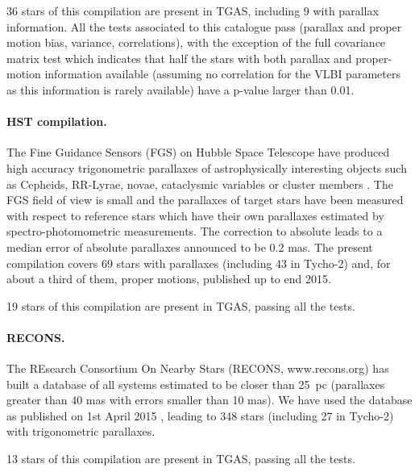 36 stars of this compilation are present in TGAS, including 9 with parallax information. All the tests associated to this catalogue pass (parallax and proper motion bias, variance, correlations), with the exception of the full covariance matrix \chitwo test which indicates that half the stars with both parallax and proper-motion information available (assuming no correlation for the VLBI parameters as this information is rarely available) have a \chitwo p-value larger than 0.01. 

\paragraph{HST compilation.} The Fine Guidance Sensors (FGS) on Hubble Space Telescope have produced high accuracy trigonometric parallaxes of astrophysically interesting objects such as Cepheids, RR-Lyrae, novae, cataclysmic variables or cluster members  \citep{2015IAUGA..2257159B, 2007AJ....133.1810B}. The FGS field of view is small and the parallaxes of target stars have been measured with respect to reference stars which have their own parallaxes estimated by spectro-photomometric measurements. The correction to absolute leads to a median error of absolute parallaxes announced to be 0.2 mas. The present compilation covers 69 stars with parallaxes (including 43 in Tycho-2) and, for about a third of them, proper motions, published up to end 2015. 

19 stars of this compilation are present in TGAS, passing all the tests. 

\paragraph{RECONS.} The REsearch Consortium On Nearby Stars (RECONS, www.recons.org) has built a database of all systems estimated to be closer than 25~pc (parallaxes greater than 40 mas with errors smaller than 10 mas). We have used the database as published on 1st April 2015 \citep{2015IAUGA..2253773H}, leading to 348 stars (including 27 in Tycho-2) with trigonometric parallaxes.

13 stars of this compilation are present in TGAS, passing all the tests. 
 



